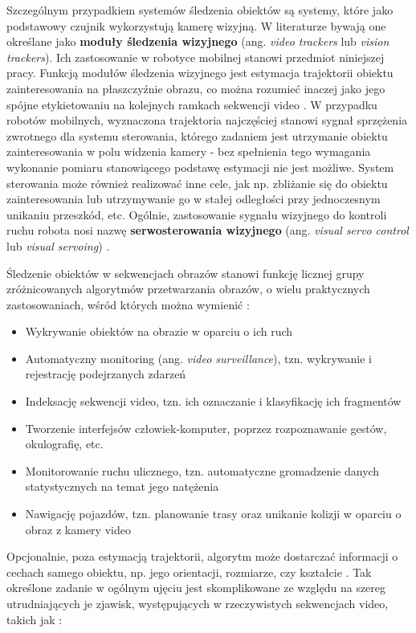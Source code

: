 Szczególnym przypadkiem systemów śledzenia obiektów są systemy, które jako podstawowy czujnik wykorzystują kamerę wizyjną. W literaturze bywają one określane jako \textbf{moduły śledzenia wizyjnego} (ang. \textit{video trackers} lub \textit{vision trackers}). Ich zastosowanie w robotyce mobilnej stanowi przedmiot niniejszej pracy. Funkcją modułów śledzenia wizyjnego jest estymacja trajektorii obiektu zainteresowania na płaszczyźnie obrazu, co można rozumieć inaczej jako jego spójne etykietowaniu na kolejnych ramkach sekwencji video \cite{Yilmaz2006}. W przypadku robotów mobilnych, wyznaczona trajektoria najczęściej stanowi sygnał sprzężenia zwrotnego dla systemu sterowania, którego zadaniem jest utrzymanie obiektu zainteresowania w polu widzenia kamery - bez spełnienia tego wymagania wykonanie pomiaru stanowiącego podstawę estymacji nie jest możliwe. System sterowania może również realizować inne cele, jak np. zbliżanie się do obiektu zainteresowania lub utrzymywanie go w stałej odległości przy jednoczesnym unikaniu przeszkód, etc. Ogólnie, zastosowanie sygnału wizyjnego do kontroli ruchu robota nosi nazwę \textbf{serwosterowania wizyjnego} (ang. \textit{visual servo control} lub \textit{visual servoing}) \cite{Chaumette2006}. 

Śledzenie obiektów w sekwencjach obrazów stanowi funkcję licznej grupy zróżnicowanych algorytmów przetwarzania obrazów, o wielu praktycznych zastosowaniach, wśród których można wymienić \cite{Yilmaz2006}:

\begin{itemize}

	\item Wykrywanie obiektów na obrazie w oparciu o ich ruch
	\item Automatyczny monitoring (ang. \textit{video surveillance}), tzn. wykrywanie i rejestrację podejrzanych zdarzeń
	\item Indeksację sekwencji video, tzn. ich oznaczanie i klasyfikację ich fragmentów
	\item Tworzenie interfejsów człowiek-komputer, poprzez rozpoznawanie gestów, okulografię, etc.
	\item Monitorowanie ruchu ulicznego, tzn. automatyczne gromadzenie danych statystycznych na temat jego natężenia
	\item Nawigację pojazdów, tzn. planowanie trasy oraz unikanie kolizji w oparciu o obraz z kamery video

\end{itemize}	
	
Opcjonalnie, poza estymacją trajektorii, algorytm może dostarczać informacji o cechach samego obiektu, np. jego orientacji, rozmiarze, czy kształcie \cite{Yilmaz2006}. Tak określone zadanie w ogólnym ujęciu jest skomplikowane ze względu na szereg utrudniających je zjawisk, występujących w rzeczywistych sekwencjach video, takich jak \cite{Yilmaz2006}:

